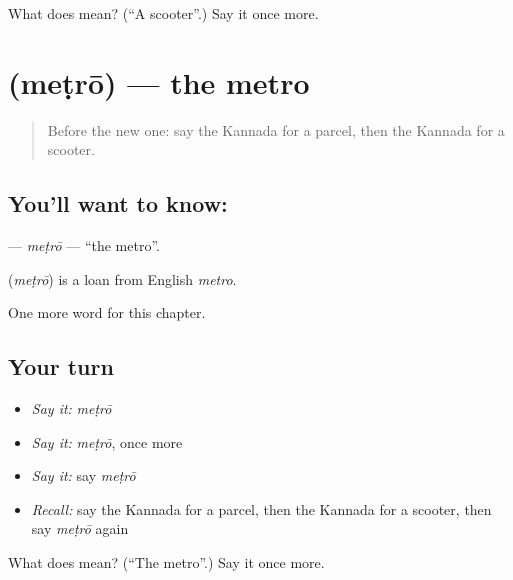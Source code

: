 \begin{tcolorbox}[breakable,colback=teal!4,colframe=teal!35!black,title={Before you move on}]
What does  mean? (\textquotedblleft{}A scooter\textquotedblright{}.) Say it once more.
\end{tcolorbox}
\section[\texorpdfstring{\kn{ಮೆಟ್ರೋ} (meṭrō)}{ಮೆಟ್ರೋ (meṭrō)}]{ (meṭrō) — the metro}

\label{lesson:KA-C296-metro}



\begin{quote}
Before the new one: say the Kannada for a parcel, then the Kannada for a scooter.
\end{quote}

\subsection*{You'll want to know: }
\textbf{} — \emph{meṭrō} — \textquotedblleft{}the metro\textquotedblright{}.

\begin{cousinweb}
\textbf{} (\emph{meṭrō}) is a loan from English \emph{metro}.
\end{cousinweb}

\begin{grammarlens}[title={What you've built}]
One more word for this chapter.
\end{grammarlens}

\subsection*{Your turn}
\begin{itemize}
\raggedright
  \item \emph{Say it:} \emph{meṭrō}
  \item \emph{Say it:} \emph{meṭrō}, once more
  \item \emph{Say it:} say \emph{meṭrō}
  \item \emph{Recall:} say the Kannada for a parcel, then the Kannada for a scooter, then say \emph{meṭrō} again
\end{itemize}

\begin{tcolorbox}[breakable,colback=teal!4,colframe=teal!35!black,title={Before you move on}]
What does  mean? (\textquotedblleft{}The metro\textquotedblright{}.) Say it once more.
\end{tcolorbox}
